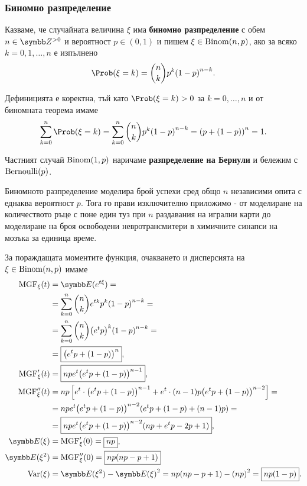 \documentclass[numbers=endperiod, bibliography=totocnumbered]{scrartcl}
\begin{document}
\subsubsection{Биномно разпределение}\label{dist:binomial}

\begin{definition}
  Казваме, че случайната величина \( \xi \) има \textbf{биномно разпределение} с обем \( n \in \ZPos \) и вероятност \( p \in (0, 1) \) и пишем \( \xi \in \operatorname{Binom}(n, p) \), ако за всяко \( k = 0, 1, \ldots, n \) е изпълнено
  \begin{equation*}
    \Prob(\xi = k) = \binom{n}{k} p^k {(1-p)}^{n-k}.
  \end{equation*}

  Дефиницията е коректна, тъй като \( \Prob(\xi = k) > 0 \) за \( k = 0, \ldots, n \) и от биномната теорема имаме
  \begin{equation*}
    \sum_{k=0}^n \Prob(\xi = k)
    =
    \sum_{k=0}^n \binom{n}{k} p^k {(1-p)}^{n-k}
    =
    {(p+(1-p))}^n = 1.
  \end{equation*}

  Частният случай \( \operatorname{Binom}(1, p) \) наричаме \textbf{разпределение на Бернули} и бележим с \( \operatorname{Bernoulli}(p) \).
\end{definition}

Биномното разпределение моделира брой успехи сред общо \( n \) независими опита с еднаква вероятност \( p \). Тога го прави изключително приложимо - от моделиране на количеството ръце с поне един туз при \( n \) раздавания на игрални карти до моделиране на броя освободени невротрансмитери в химичните синапси на мозъка за единица време.

За пораждащата моментите функция, очакването и дисперсията на \( \xi \in \operatorname{Binom}(n, p) \) имаме
\begingroup
\allowdisplaybreaks
\begin{align*}
  \MGF_\xi(t)
  &=
  \Expect(e^{t\xi})
  = \\ &=
  \sum_{k=0}^n \binom{n}{k} e^{tk} p^k {(1-p)}^{n-k}
  = \\ &=
  \sum_{k=0}^n \binom{n}{k} {\left( e^t p \right)}^k {(1-p)}^{n-k}
  = \\ &=
  \boxed{{\left( e^t p + (1-p) \right)}^n},
  \\
  \MGF'_\xi(t)
  &=
  \boxed{n p e^t {\left( e^t p + (1-p) \right)}^{n-1}},
  \\
  \MGF''_\xi(t)
  &=
  n p \left[ e^t \cdot {\left( e^t p + (1-p) \right)}^{n-1} + e^t \cdot (n-1) p {\left( e^t p + (1-p) \right)}^{n-2} \right]
  = \\ &=
  n p e^t {\left( e^t p + (1-p) \right)}^{n-2} (e^t p + (1-p) + (n-1)p)
  = \\ &=
  \boxed{n p e^t {\left( e^t p + (1-p) \right)}^{n-2} (np + e^t p - 2p + 1)},
  \\
  \Expect(\xi)
  &=
  \MGF'_\xi(0)
  =
  \boxed{np},
  \\
  \Expect(\xi^2)
  &=
  \MGF''_\xi(0)
  =
  \boxed{np(np - p + 1)}
  \\
  \Var(\xi)
  &=
  \Expect(\xi^2) - {\Expect(\xi)}^2
  =
  np(np - p + 1) - {(np)}^2
  =
  \boxed{np(1 - p)}.
\end{align*}
\endgroup
\end{document}
